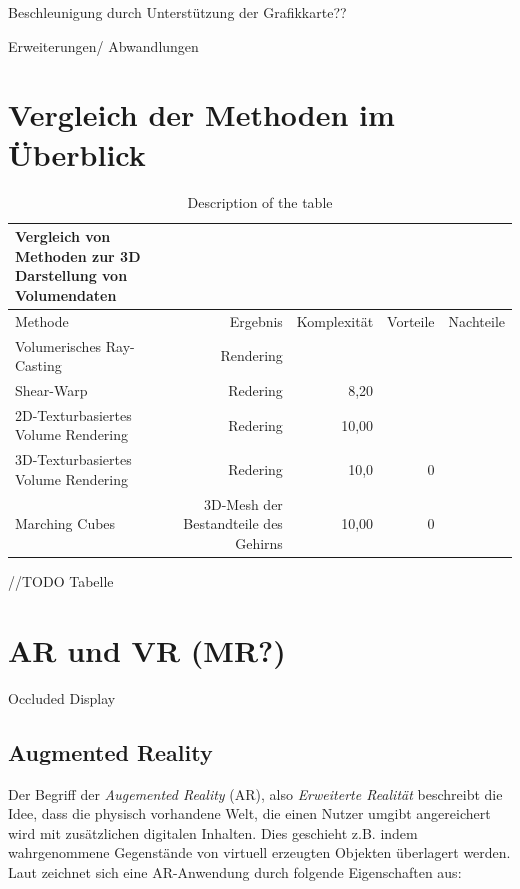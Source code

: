 \cite{Lorensen87}

Beschleunigung durch Unterstützung der Grafikkarte??

Erweiterungen/ Abwandlungen


\section{Vergleich der Methoden im Überblick}											 %
\begin{table}
\centering
\begin{tabular}{lrrrr}
\toprule
Vergleich von Methoden zur 3D Darstellung von Volumendaten\\  
\midrule 
Methode & Ergebnis & Komplexität & Vorteile & Nachteile \\ 
\midrule 
Volumerisches Ray-Casting & Rendering &  & & \\
Shear-Warp & Redering & 8,20 & & \\
2D-Texturbasiertes Volume Rendering & Redering  & 10,00 & & \\ 
3D-Texturbasiertes Volume Rendering & Redering  & 10,0 & 0 &\\ 
Marching Cubes & 3D-Mesh der Bestandteile des Gehirns  & 10,00 & 0 &\\ 
\bottomrule
\end{tabular}
\caption{Description of the table}\label{volumeRenderingVergleich}
\end{table}

//TODO
Tabelle
\section{AR und VR (MR?)}									 %
Occluded Display 

\subsection{Augmented Reality}

Der Begriff der \textit{Augemented Reality} (AR), also \textit{Erweiterte Realität} beschreibt die Idee, dass die physisch vorhandene Welt, die einen Nutzer umgibt angereichert wird mit zusätzlichen digitalen Inhalten. Dies geschieht z.B. indem wahrgenommene Gegenstände von virtuell erzeugten Objekten überlagert werden. 
Laut \cite{azuma97} zeichnet sich eine AR-Anwendung durch folgende Eigenschaften aus:

